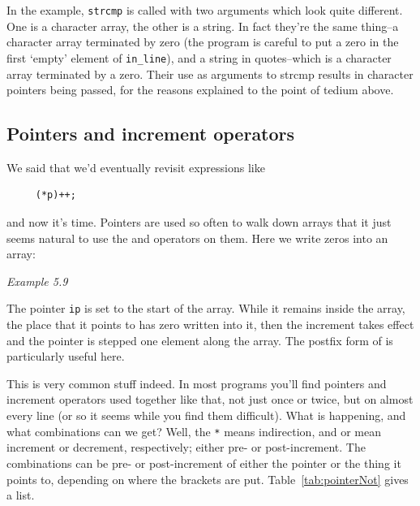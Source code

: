    In the example, \texttt{strcmp} is called with two arguments which
    look quite different. One is a character array, the other is a string.
    In fact they're the same thing--a character array terminated by zero
    (the program is careful to put a zero in the first `empty' element
    of \texttt{in\_line}), and a string in quotes--which is
    a character array terminated by a zero. Their use as arguments to strcmp
    results in character pointers being passed, for the reasons explained to
    the point of tedium above.


  

  \subsection{Pointers and increment operators}
   

   We said that we'd eventually revisit expressions like


   \begin{Verbatim}
     (*p)++;
   \end{Verbatim}

   and now it's time. Pointers are used so often to walk down arrays that
    it just seems natural to use the \pp{} and \mm{}
    operators on them. Here we write zeros into an array:


    \begin{center}\textit{Example 5.9}\end{center}


   The pointer \texttt{ip} is set to the start of the array. While it
    remains inside the array, the place that it points to has zero written
    into it, then the increment takes effect and the pointer is stepped one
    element along the array. The postfix form of \pp{} is
    particularly useful here.


   This is very common stuff indeed. In most programs you'll find
    pointers and increment operators used together like that, not just once
    or twice, but on almost every line (or so it seems while you find them
    difficult). What is happening, and what combinations can we get? Well,
    the \texttt{*} means indirection, and \pp{} or
    \mm{} mean increment or decrement, respectively;
    either pre- or post-increment.
    The combinations can be pre- or post-increment
    of either the pointer or the thing it points to,
    depending on where the brackets are put.
    Table~\ref{tab:pointerNot} gives a list.


